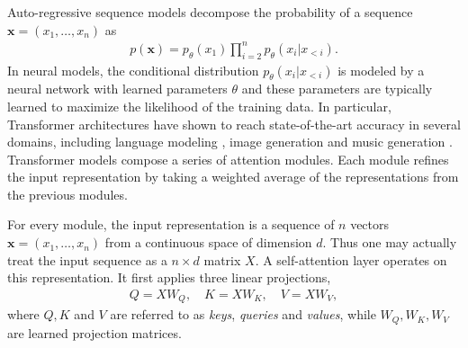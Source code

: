 \documentclass[a4paper]{article}
\begin{document}
Auto-regressive sequence models decompose the probability of 
a sequence \(\mathbf{x} = \left(x_1, \dots, x_n\right)\) as
\begin{align}
    p(\mathbf{x}) = p_\theta(x_1) \prod_{i=2}^{n} p_\theta(x_{i} | x_{< i}).
\end{align}
In neural models, the conditional distribution 
\(p_\theta(x_{i} | x_{< i})\) 
is modeled by a neural network with learned parameters \(\theta\)
and these parameters are typically learned to maximize the 
likelihood of the training data.
In particular, Transformer architectures have shown to reach 
state-of-the-art accuracy in several domains,
including language modeling \citep{vaswani2017attention, radford2018improving}, 
image generation \citep{parmar2018image} and 
music generation \citep{huang2018music}. 
Transformer models compose a series of attention modules. Each module
refines the input representation by taking a weighted average of the 
representations from the previous modules.

For every module, the input representation is a sequence of $n$ vectors
$
\mathbf{x} = (x_1, \dots, x_n)
$
from a continuous space of dimension \(d\). Thus one may actually treat 
the input sequence as a \(n \times d\) matrix \(X\). A self-attention layer
operates on this representation. It first applies three linear projections,
\begin{align}
Q = X W_Q, \quad
K = X W_K, \quad
V = X W_V,
\end{align}
where $Q, K$ and $V$ are referred to as \emph{keys}, \emph{queries} and \emph{values},
while $W_Q, W_K, W_V$ are learned projection matrices.
\end{document}

